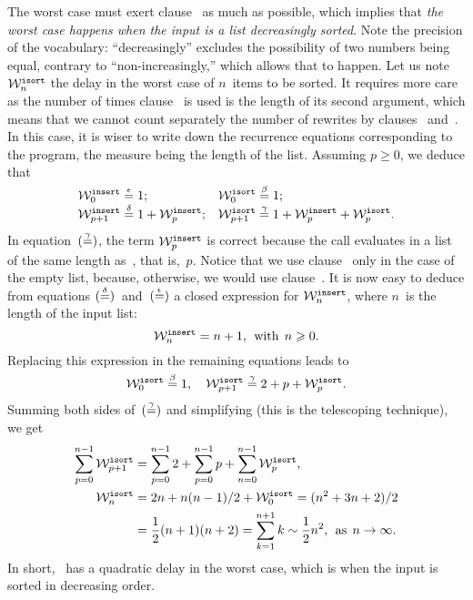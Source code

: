The worst case must exert clause~\clause{\delta} as much as possible,
which implies that \emph{the worst case happens when the input is a
  list decreasingly sorted}. Note the precision of the vocabulary:
``decreasingly'' excludes the possibility of two numbers being equal,
contrary to ``non\hyp{}increasingly,'' which allows that to
happen. Let us note \(\worst{isort}{n}\) the delay in the worst case
of \(n\)~items to be sorted. It requires more care as the number of
times clause~\clause{\delta} is used is the length of its second
argument, which means that we cannot count separately the number of
rewrites by clauses \clause{\gamma}~and~\clause{\delta}. In this case,
it is wiser to write down the recurrence equations corresponding to
the program, the measure being the length of the list. Assuming
\(p\geqslant{}0\), we deduce that
\begin{align*}
  \worst{insert}{0}    &\eqn{\epsilon} 1;
& \worst{isort}{0}   &\eqn{\beta} 1;\\
  \worst{insert}{p+1}  &\eqn{\delta} 1 + \worst{insert}{p};
& \worst{isort}{p+1} &\eqn{\gamma} 1 + \worst{insert}{p} +
                                         \worst{isort}{p}.
\end{align*}
In equation~\((\eqn{\gamma})\), the term \(\worst{insert}{p}\) is
correct because the call  evaluates in a list of the
same length as~, that is,~\(p\). Notice that we use
clause~\clause{\epsilon} only in the case of the empty list, because,
otherwise, we would use clause~\clause{\delta}. It is now easy to
deduce from equations \((\eqn{\delta})\)~and~\((\eqn{\epsilon})\) a
closed expression for \(\worst{insert}{n}\), where \(n\)~is the length
of the input list:
\[
\worst{insert}{n} = n + 1,\,\; \text{with} \,\; n \geqslant 0.
\]
Replacing this expression in the remaining equations leads to
\[
\worst{isort}{0}   \eqn{\beta} 1,\quad
\worst{isort}{p+1} \eqn{\gamma} 2 + p + \worst{isort}{p}.
\]
Summing both sides of~\((\eqn{\gamma})\) and simplifying (this is the
telescoping technique), we get
\begin{align*}
\sum_{p=0}^{n-1}{\worst{isort}{p+1}}
  &= \sum_{p=0}^{n-1}{2} + \sum_{p=0}^{n-1}{p}
     + \sum_{n=0}^{n-1}{\worst{isort}{p}},\\
\worst{isort}{n}
  &= 2n + n(n-1)/2 + \worst{isort}{0}
  = (n^2 + 3n + 2)/2\\ 
  &= \frac{1}{2}(n+1)(n+2) = \sum_{k=1}^{n+1}{k}
 \mathrel{\sim} \frac{1}{2} n^2,\;\, \text{as}
\,\; n \rightarrow \infty.
\end{align*}
In short, ~has a quadratic delay in the worst case,
which is when the input is sorted in decreasing order.

